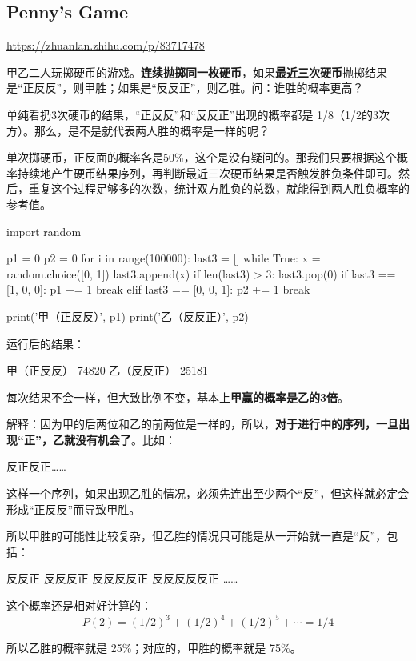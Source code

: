 \documentclass[12pt]{article}
\begin{document}
\subsection{Penny's Game}
\url{https://zhuanlan.zhihu.com/p/83717478}

甲乙二人玩掷硬币的游戏。\textbf{连续抛掷同一枚硬币}，如果\textbf{最近三次硬币}抛掷结果是“正反反”，则甲胜；如果是“反反正”，则乙胜。问：谁胜的概率更高？

单纯看扔3次硬币的结果，“正反反”和“反反正”出现的概率都是 1/8（1/2的3次方）。那么，是不是就代表两人胜的概率是一样的呢？

单次掷硬币，正反面的概率各是50\%，这个是没有疑问的。那我们只要根据这个概率持续地产生硬币结果序列，再判断最近三次硬币结果是否触发胜负条件即可。然后，重复这个过程足够多的次数，统计双方胜负的总数，就能得到两人胜负概率的参考值。
\begin{python}
import random

p1 = 0
p2 = 0
for i in range(100000):
    last3 = []
    while True:
        x = random.choice([0, 1])
        last3.append(x)
        if len(last3) > 3:
            last3.pop(0)
        if last3 == [1, 0, 0]:
            p1 += 1
            break
        elif last3 == [0, 0, 1]:
            p2 += 1
            break

print('甲（正反反）', p1)
print('乙（反反正）', p2)
\end{python}

运行后的结果：
\begin{python}
甲（正反反） 74820
乙（反反正） 25181
\end{python}

每次结果不会一样，但大致比例不变，基本上\textbf{甲赢的概率是乙的3倍}。

解释：因为甲的后两位和乙的前两位是一样的，所以，\textbf{对于进行中的序列，一旦出现“正”，乙就没有机会了}。比如：
\begin{python}
反正反正……
\end{python}
这样一个序列，如果出现乙胜的情况，必须先连出至少两个“反”，但这样就必定会形成“正反反”而导致甲胜。

所以甲胜的可能性比较复杂，但乙胜的情况只可能是从一开始就一直是“反”，包括：
\begin{python}
反反正
反反反正
反反反反正
反反反反反正
……
\end{python}

这个概率还是相对好计算的：
$$
P(2) = (1/2)^3 + (1/2)^4 + (1/2)^5 + \cdots = 1/4
$$

所以乙胜的概率就是 25\%；对应的，甲胜的概率就是 75\%。
\end{document}
